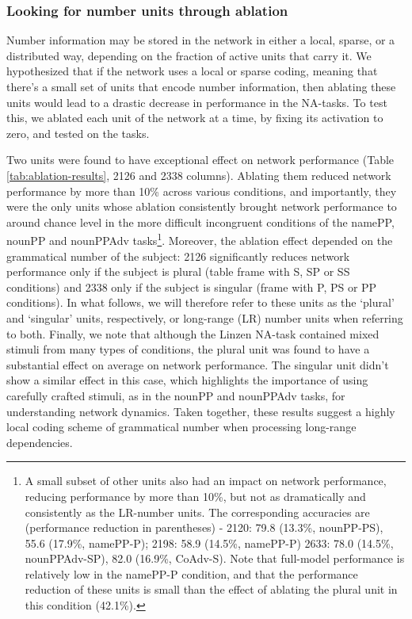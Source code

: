 \subsubsection{Looking for number units through ablation}

Number information may be stored in the network in either a local,
sparse, or a distributed way, depending on the fraction of active
units that carry it.  We hypothesized that if the network uses a local
or sparse coding, meaning that there's a small set of units that
encode number information, then ablating these units would lead to a
drastic decrease in performance in the NA-tasks.  To test this, we
ablated each unit of the network at a time, by fixing its activation
to zero, and tested on the tasks.

Two units were found to have exceptional effect on network performance
(Table \ref{tab:ablation-results}, \unit{2}{126} and \unit{2}{338}
columns). Ablating them reduced network performance by more than 10\%
across various conditions, and importantly, they were the only units
whose ablation consistently brought network performance to around
chance level in the more difficult incongruent conditions of the
namePP, nounPP and nounPPAdv tasks\footnote{A small subset of other units
also had an impact on network performance, reducing performance by more than 10\%, but not as dramatically and consistently as the LR-number units. The corresponding accuracies are (performance reduction in parentheses) - \unit{2}{120}: 79.8 (13.3\%, nounPP-PS), 55.6 (17.9\%, namePP-P); \unit{2}{198}: 58.9 (14.5\%, namePP-P) \unit{2}{633}: 78.0 (14.5\%, nounPPAdv-SP), 82.0 (16.9\%, CoAdv-S). Note that full-model performance is relatively low in the namePP-P condition, and that the performance reduction of these units is small than the effect of ablating the plural unit in this condition (42.1\%).}. Moreover, the ablation effect depended on the grammatical number of the subject: \unit{2}{126} significantly reduces
network performance only if the subject is plural (table frame with S, SP or SS conditions) and \unit{2}{338}
only if the subject is singular (frame with P, PS or PP conditions). In what follows, we will therefore
refer to these units as the `plural' and `singular' units, respectively,
or long-range (LR) number units when referring to both. Finally, we note that although the Linzen NA-task contained mixed stimuli from many types of conditions, the plural unit was found to have a substantial effect on average on network performance. The singular unit didn't show a similar effect in this case, which highlights the importance of using carefully crafted stimuli, as in the nounPP and nounPPAdv tasks, for understanding network dynamics. Taken
together, these results suggest a highly local coding scheme of
grammatical number when processing long-range dependencies.

